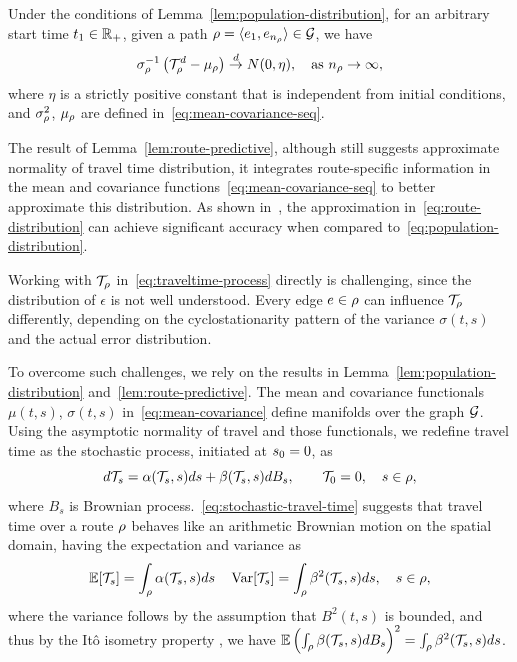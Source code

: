 \documentclass[12pt]{article}
\begin{document}
{{{{{\begin{lemma} \label{lem:route-predictive} Under the conditions of Lemma~\ref{lem:population-distribution}, for an arbitrary start time $t_1 \in \mathbb{R}_+$, given a path $\rho={\langle e_1,e_{n_\rho}\rangle } \in \mathcal{G}$, we have 
\begin{equation}\label{eq:route-distribution}
    \sigma^{-1}_{\rho} \left(\mathcal{T}^d_\rho - \mu_\rho\right) \stackrel{d}{\to} N(0, \eta), \quad \text{as  } n_\rho \to \infty,
\end{equation}
where $\eta$ is a strictly positive constant that is independent from initial conditions, and $\sigma^2_\rho $, $\mu_\rho$ are defined in~\eqref{eq:mean-covariance-seq}. 
\end{lemma}

The result of Lemma~\ref{lem:route-predictive}, although still suggests approximate normality of travel time distribution, it integrates route-specific information in the mean and covariance functions~\eqref{eq:mean-covariance-seq} to better approximate this distribution. As shown in~\citet[Fig.~3]{elmasri2020predictive}, the approximation in~\eqref{eq:route-distribution} can achieve significant accuracy when compared to~\eqref{eq:population-distribution}. 

Working with $\mathcal{T}_\rho$ in~\eqref{eq:traveltime-process} directly is challenging, since the distribution of $\epsilon$ is not well understood. Every edge $e \in \rho$ can influence $\mathcal{T}_\rho$ differently, depending on the cyclostationarity pattern of the variance $\sigma(t,s)$ and the actual error distribution. 

To overcome such challenges, we rely on the results in Lemma~\ref{lem:population-distribution} and~\ref{lem:route-predictive}. The mean and covariance functionals $\mu(t,s)$, $\sigma(t,s)$ in~\eqref{eq:mean-covariance} define manifolds over the graph $\mathcal{G}$. Using the asymptotic normality of travel and those functionals, we redefine travel time as the stochastic process, initiated at ${s_0}=0$, as
\begin{equation}\label{eq:stochastic-travel-time}
    d\mathcal{T}_{s} = \alpha(\mathcal{T}_{s}, s)ds+ \beta(\mathcal{T}_{s}, s)dB_s,\qquad \mathcal{T}_0 = 0,   \quad s \in \rho,
\end{equation}
where $B_s$ is Brownian process.~\eqref{eq:stochastic-travel-time} suggests that travel time over a route $\rho$ behaves like an arithmetic Brownian motion on the spatial domain, having the expectation and variance as 
\[\mathbb{E}[\mathcal{T}_s] = \int_\rho \alpha(\mathcal{T}_s,s)ds \quad \operatorname{{\rm Var}}[\mathcal{T}_s]  = \int_\rho \beta^2(\mathcal{T}_s, s)ds, \quad s \in \rho,\]
where the variance follows by the assumption that $B^2(t,s)$ is bounded, and thus by the Itô isometry property \citet[Lem.~3.1.5]{oksendal2013stochastic}, we have $\mathbb{E}\left(\int_\rho \beta(\mathcal{T}_s, s)dB_s\right)^2 = \int_\rho \beta^2(\mathcal{T}_s,s)ds$. 

}}}}}
\end{document}
